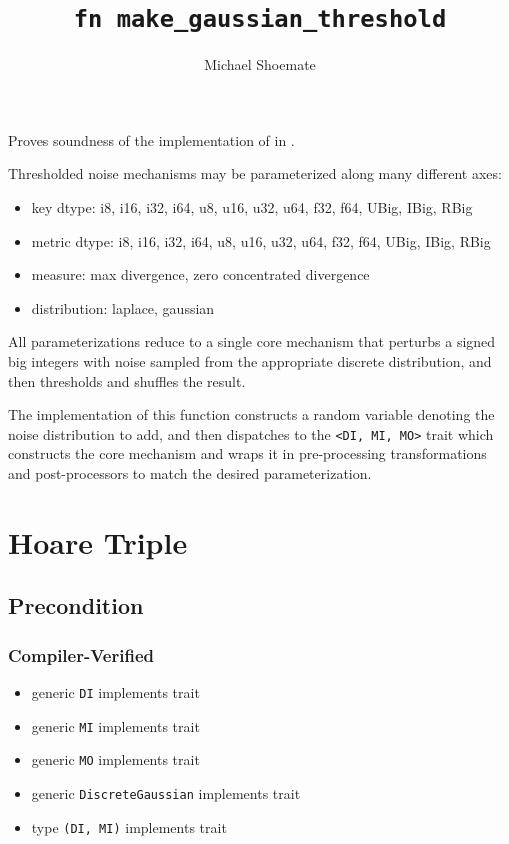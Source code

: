 \documentclass{article}
\title{\texttt{fn make\_gaussian\_threshold}}
\author{Michael Shoemate}
\date{}
\begin{document}
\maketitle

\contrib
Proves soundness of the implementation of  in .

Thresholded noise mechanisms may be parameterized along many different axes:
\begin{itemize}
    \item key dtype: i8, i16, i32, i64, u8, u16, u32, u64, f32, f64, UBig, IBig, RBig
    \item metric dtype: i8, i16, i32, i64, u8, u16, u32, u64, f32, f64, UBig, IBig, RBig
    \item measure: max divergence, zero concentrated divergence
    \item distribution: laplace, gaussian
\end{itemize}

All parameterizations reduce to a single core mechanism that perturbs
a signed big integers with noise sampled from the appropriate discrete distribution,
and then thresholds and shuffles the result.

The implementation of this function constructs a random variable denoting the noise distribution to add, 
and then dispatches to the \texttt{<DI, MI, MO>} trait
which constructs the core mechanism and wraps it in pre-processing transformations and post-processors to match the desired parameterization.

\section{Hoare Triple}
\subsection*{Precondition}
\subsubsection*{Compiler-Verified}
\begin{itemize}
    \item generic \texttt{DI} implements trait 
    \item generic \texttt{MI} implements trait 
    \item generic \texttt{MO} implements trait 
    \item generic \texttt{DiscreteGaussian} implements trait 
    \item type \texttt{(DI, MI)} implements trait 
\end{itemize}
\end{document}
